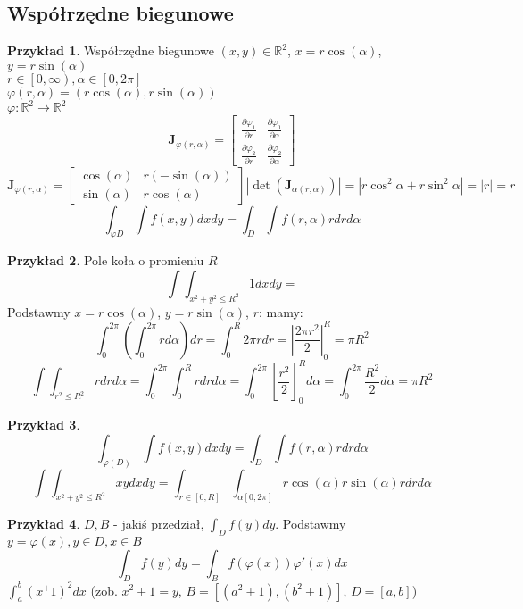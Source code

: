 \documentclass{article}
\theoremstyle{definition}
\theoremstyle{definition}
\theoremstyle{definition}
\newtheorem{pk}{Przykład}[subsection]
\theoremstyle{definition}
\theoremstyle{definition}
\theoremstyle{definition}
\theoremstyle{definition}
\begin{document}
\subsection{Współrzędne biegunowe}

\begin{pk}
    Współrzędne biegunowe $(x,y)\in\mathbb{R}^2$, $x=r\cos(\alpha)$, $y=r\sin(\alpha)$\\
    $r\in\left[0,\infty\right), \alpha \in [0,2\pi]$\\
    $\varphi(r,\alpha) = \left(r\cos(\alpha),r\sin(\alpha)\right)$\\
    $\varphi : \mathbb{R}^2 \rightarrow \mathbb{R}^2$\\
    \[\mathbf{J}_{\varphi(r,\alpha)} = \begin{bmatrix}\frac{\partial \varphi_1}{\partial r}&\frac{\partial \varphi_1}{\partial \alpha}\\\frac{\partial \varphi_2}{\partial r}&\frac{\partial \varphi_2}{\partial \alpha}\end{bmatrix}\]
    \[\mathbf{J}_{\varphi(r,\alpha)} = \begin{bmatrix}\cos(\alpha)&r(-\sin(\alpha))\\\sin(\alpha)&r\cos(\alpha)\end{bmatrix} |\det(\mathbf{J}_{\alpha(r,\alpha)})| = |r\cos^2\alpha + r\sin^2 \alpha| = |r| = r\]
    \[\int_{\varphi{D}} \int f(x,y) dx dy = \int_D \int f(r,\alpha) r dr d\alpha\]
\end{pk}

\begin{pk}
    Pole koła o promieniu $R$
    \[\int\int_{x^2+y^2\leq R^2} 1 dx dy =\]
    Podstawmy $x=r\cos(\alpha)$, $y=r\sin(\alpha)$, $r$: mamy:\\
    \[\int_{0}^{2\pi}\left(\int_{0}^{2\pi} r d\alpha\right) dr = \int_{0}^{R} 2\pi r dr = \left|\frac{2\pi r^2}{2}\right|_{0}^{R} = \pi R^2\]
    \[\int\int_{r^2\leq R^2} r dr d\alpha = \int_0^{2\pi} \int_0^R r dr d\alpha = \int_0^{2\pi} \left[\frac{r^2}{2}\right]_0^R d\alpha = \int_0^{2\pi} \frac{R^2}{2} d\alpha = \pi R^2\]
\end{pk}

\begin{pk}
    \[\int_{\varphi(D)}\int f(x,y) dxdy = \int_{D}\int f(r,\alpha) r dr d\alpha\]
    \[\int\int_{x^2+y^2\leq R^2} xy dx dy = \int_{r\in[0,R]}\int_{\alpha[0,2\pi]} r\cos(\alpha) r\sin(\alpha) r dr d\alpha\]
\end{pk}

\begin{pk}
    $D, B$ - jakiś przedział,  $\int_D f(y) dy$. Podstawmy $y=\varphi(x), y\in D, x\in B$\\
    \[\int_D f(y) dy = \int_B f(\varphi(x)) \varphi'(x) dx\]
    $\int_{a}^{b} (x^+1)^2 dx$ (zob. $x^2+1=y$, $B=[(a^2+1),(b^2+1)]$, $D=[a,b]$)
\end{pk}
\end{document}
